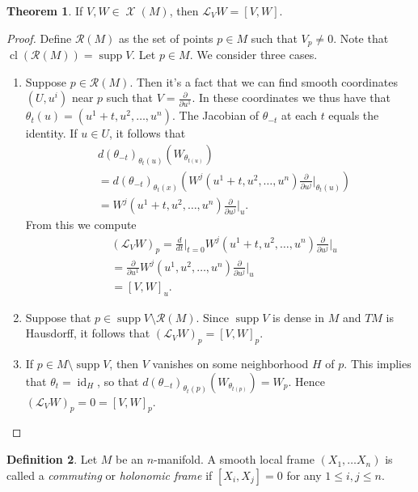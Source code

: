 \documentclass[10pt,letterpaper,cm]{nupset}
\theoremstyle{definition}
\newtheorem{definition}{Definition}[subsection]
\theoremstyle{theorem}
\newtheorem{theorem}[definition]{Theorem}
\theoremstyle{remark}
\newcommand{\1}{\mathbf{1}}
\newcommand{\0}{\vec 0}
\DeclareMathOperator{\id}{id}
\DeclareMathOperator{\supp}{supp}
\DeclareMathOperator{\cl}{cl}
\DeclareMathOperator{\vf}{\mathscr{X}}
\begin{document}
\begin{theorem}
If $V, W\in \vf(M)$, then $\mathcal{L}_VW = [V, W]$.
\end{theorem}
\begin{proof}
Define $\mathcal{R}(M)$ as the set of points $p\in M$ such that $V_p\ne 0$. Note that $\cl\left(\mathcal{R}(M)\right) = \supp V$. Let $p\in M$. We consider three cases.
\begin{enumerate}
\item Suppose $p\in \mathcal{R}(M)$. Then it's a fact that we can find smooth coordinates $(U, u^i)$ near $p$ such that $V= \frac{\partial}{\partial{u^1}}$. In these coordinates we thus have that $\theta_t(u) = (u^1 +t, u^2, \ldots, u^n)$. The Jacobian of ${\theta_{-t}}$ at each $t$ equals the identity. If $u\in U$, it follows that
\begin{align*}
& d(\theta_{-t})_{\theta_t(u)}(W_{\theta_{t(u)}})
\\ & = d(\theta_{-t})_{\theta_t(x)} \left(W^j(u^1 + t, u^2, \ldots, u^n)\frac{\partial}{\partial{u^j}}\bigr\rvert_{\theta_t(u)}\right)
\\ & = W^j(u^1 + t, u^2, \ldots, u^n)\frac{\partial}{\partial{u^j}}\bigr\rvert_{u}.
\end{align*}
From this we compute
\begin{align*}
& (\mathcal{L}_VW)_p= \frac{d}{dt}\bigr\rvert_{t=0} W^j(u^1 + t, u^2, \ldots, u^n)\frac{\partial}{\partial{u^j}}\bigr\rvert_{u}
\\ & = \frac{\partial}{\partial{u^1}}W^j(u^1 , u^2, \ldots, u^n)\frac{\partial}{\partial{u^j}}\bigr\rvert_{u}
\\ & = [V, W]_u
.\end{align*}
\item Suppose that $p\in \supp V \setminus \mathcal{R}(M)$. Since $\supp V$ is dense in $M$ and $TM$ is Hausdorff, it follows that $(\mathcal{L}_VW)_p = [V, W]_p$.
\item If $p\in  M\setminus \supp V$, then $V$ vanishes on some neighborhood $H$ of $p$. This implies that $\theta_t = \id_H$, so that $d(\theta_{-t})_{\theta_t(p)}(W_{\theta_{t(p)}}) = W_p$. Hence $(\mathcal{L}_VW)_p =0 = [V, W]_p$.
\end{enumerate}
\end{proof}

\begin{definition}
Let $M$ be an $n$-manifold. A smooth local frame $(X_1, \ldots X_n)$ is called a \textit{commuting} or \textit{holonomic frame} if $[X_i, X_j]=0$ for any $1\leq i,j\leq n$.
\end{definition}
\end{document}
